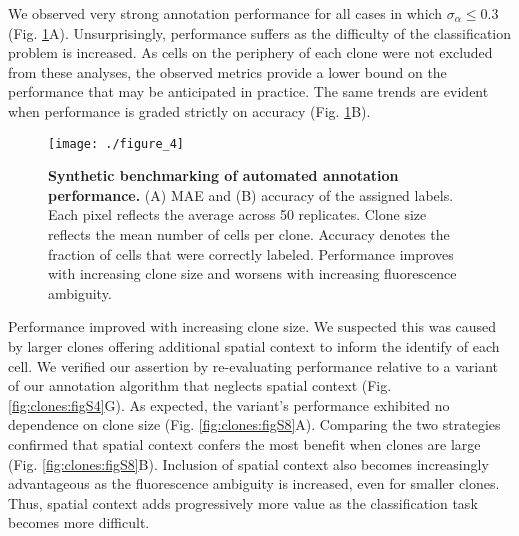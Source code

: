 We observed very strong annotation performance for all cases in which $\sigma_{\alpha} \leq 0.3$ (Fig. \ref{fig:clones:fig4}A). Unsurprisingly, performance suffers as the difficulty of the classification problem is increased. As cells on the periphery of each clone were not excluded from these analyses, the observed metrics provide a lower bound on the performance that may be anticipated in practice. The same trends are evident when performance is graded strictly on accuracy (Fig. \ref{fig:clones:fig4}B).

\begin{figure}[t]
\centering
\texttt{[image: ./figure\_4]}
\caption[Synthetic benchmarking of automated annotation performance.]{\textbf{Synthetic benchmarking of automated annotation performance.} (A) MAE and (B) accuracy of the assigned labels. Each pixel reflects the average across 50 replicates. Clone size reflects the mean number of cells per clone. Accuracy denotes the fraction of cells that were correctly labeled. Performance improves with increasing clone size and worsens with increasing fluorescence ambiguity.}
\label{fig:clones:fig4}
\end{figure}

Performance improved with increasing clone size. We suspected this was caused by larger clones offering additional spatial context to inform the identify of each cell. We verified our assertion by re-evaluating performance relative to a variant of our annotation algorithm that neglects spatial context (Fig. \ref{fig:clones:figS4}G). As expected, the variant's performance exhibited no dependence on clone size (Fig. \ref{fig:clones:figS8}A). Comparing the two strategies confirmed that spatial context confers the most benefit when clones are large (Fig. \ref{fig:clones:figS8}B). Inclusion of spatial context also becomes increasingly advantageous as the fluorescence ambiguity is increased, even for smaller clones. Thus, spatial context adds progressively more value as the classification task becomes more difficult.

